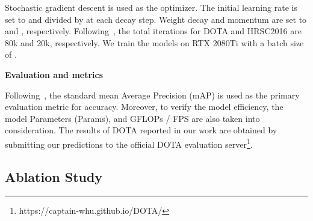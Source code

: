 \documentclass[journal]{IEEEtran}
\newcommand{\myparagraph}[1]{\vspace{0.1em}\noindent\textbf{#1}}
\begin{document}
Stochastic gradient descent is used as the optimizer. The initial learning rate is set to  and divided by  at each decay step. Weight decay and momentum are set to  and , respectively. Following~\cite{xia2018dota, lb2017high}, the total iterations for DOTA and HRSC2016 are 80k and 20k, respectively. We train the models on RTX 2080Ti with a batch size of .

\myparagraph{Evaluation and metrics}

Following~\cite{xia2018dota}, the standard mean Average Precision (mAP) is used as the primary evaluation metric for accuracy. Moreover, to verify the model efficiency, the model Parameters (Params), and GFLOPs / FPS are also taken into consideration. The results of DOTA reported in our work are obtained by submitting our predictions to the official DOTA evaluation server\footnote{https://captain-whu.github.io/DOTA/}.

\begin{table*}[t]
    \begin{center}
    \renewcommand\tabcolsep{4.0pt}
    \begin{threeparttable}
    \end{threeparttable}
    \end{center}
    \caption{The effectiveness of different inference schemes with our DEA-Net on  DOTA~\cite{xia2018dota} for horizontal object detection in aerial images. ResNet-101~\cite{he2016deep} is the backbone.}
    \label{t2}
\end{table*}

\subsection{Ablation Study}
\end{document}

